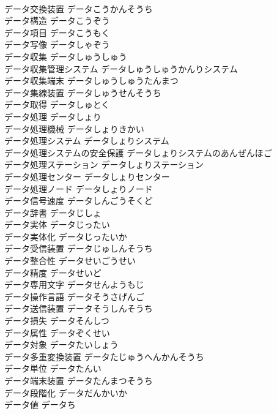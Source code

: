 \documentclass[8pt]{extreport}
\begin{document}
\begin{CJK}{UTF8}{min}
\\	データ交換装置	データこうかんそうち	
\\	データ構造	データこうぞう	
\\	データ項目	データこうもく	
\\	データ写像	データしゃぞう	
\\	データ収集	データしゅうしゅう	
\\	データ収集管理システム	データしゅうしゅうかんりシステム	
\\	データ収集端末	データしゅうしゅうたんまつ	
\\	データ集線装置	データしゅうせんそうち	
\\	データ取得	データしゅとく	
\\	データ処理	データしょり	
\\	データ処理機械	データしょりきかい	
\\	データ処理システム	データしょりシステム	
\\	データ処理システムの安全保護	データしょりシステムのあんぜんほご	
\\	データ処理ステーション	データしょりステーション	
\\	データ処理センター	データしょりセンター	
\\	データ処理ノード	データしょりノード	
\\	データ信号速度	データしんごうそくど	
\\	データ辞書	データじしょ	
\\	データ実体	データじったい	
\\	データ実体化	データじったいか	
\\	データ受信装置	データじゅしんそうち	
\\	データ整合性	データせいごうせい	
\\	データ精度	データせいど	
\\	データ専用文字	データせんようもじ	
\\	データ操作言語	データそうさげんご	
\\	データ送信装置	データそうしんそうち	
\\	データ損失	データそんしつ	
\\	データ属性	データぞくせい	
\\	データ対象	データたいしょう	
\\	データ多重変換装置	データたじゅうへんかんそうち	
\\	データ単位	データたんい	
\\	データ端末装置	データたんまつそうち	
\\	データ段階化	データだんかいか	
\\	データ値	データち	

\end{CJK}
\end{document}
